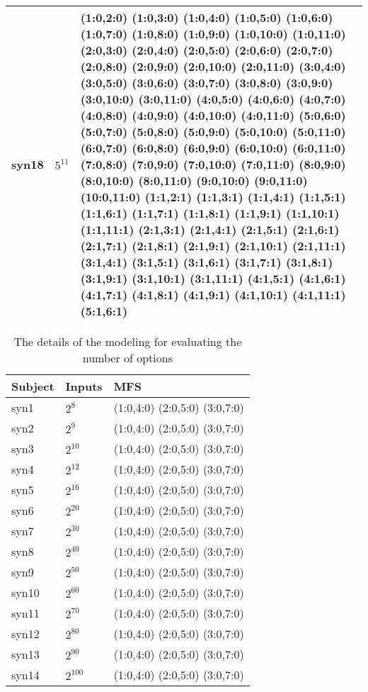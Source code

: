 \documentclass[10pt,journal,compsoc]{IEEEtran}
\begin{document}
\begin{table*}[htbp]
\begin{tabular}{|c|c|m{}|}
syn18 & $5^{11}$ & (1:0,2:0) (1:0,3:0) (1:0,4:0) (1:0,5:0) (1:0,6:0) (1:0,7:0) (1:0,8:0) (1:0,9:0) (1:0,10:0) (1:0,11:0) (2:0,3:0) (2:0,4:0) (2:0,5:0) (2:0,6:0) (2:0,7:0) (2:0,8:0) (2:0,9:0) (2:0,10:0) (2:0,11:0) (3:0,4:0) (3:0,5:0) (3:0,6:0) (3:0,7:0) (3:0,8:0) (3:0,9:0) (3:0,10:0) (3:0,11:0) (4:0,5:0) (4:0,6:0) (4:0,7:0) (4:0,8:0) (4:0,9:0) (4:0,10:0) (4:0,11:0) (5:0,6:0) (5:0,7:0) (5:0,8:0) (5:0,9:0) (5:0,10:0) (5:0,11:0) (6:0,7:0) (6:0,8:0) (6:0,9:0) (6:0,10:0) (6:0,11:0) (7:0,8:0) (7:0,9:0) (7:0,10:0) (7:0,11:0) (8:0,9:0) (8:0,10:0) (8:0,11:0) (9:0,10:0) (9:0,11:0) (10:0,11:0) (1:1,2:1) (1:1,3:1) (1:1,4:1) (1:1,5:1) (1:1,6:1) (1:1,7:1) (1:1,8:1) (1:1,9:1) (1:1,10:1) (1:1,11:1) (2:1,3:1) (2:1,4:1) (2:1,5:1) (2:1,6:1) (2:1,7:1) (2:1,8:1) (2:1,9:1) (2:1,10:1) (2:1,11:1) (3:1,4:1) (3:1,5:1) (3:1,6:1) (3:1,7:1) (3:1,8:1) (3:1,9:1) (3:1,10:1) (3:1,11:1) (4:1,5:1) (4:1,6:1) (4:1,7:1) (4:1,8:1) (4:1,9:1) (4:1,10:1) (4:1,11:1) (5:1,6:1)  \\ \hline

\end{tabular}

\end{table*}
\begin{table}[htbp]
\center
\caption{The details of the modeling for evaluating the number of options}
\label{detail-eva-op}

\begin{tabular}{|l|l|l|}
\hline
Subject & Inputs & MFS  \\\hline
syn1 & $2^{8}$ & (1:0,4:0) (2:0,5:0) (3:0,7:0)  \\ \hline
syn2 & $2^{9}$ & (1:0,4:0) (2:0,5:0) (3:0,7:0)  \\ \hline
syn3 & $2^{10}$ & (1:0,4:0) (2:0,5:0) (3:0,7:0)  \\ \hline
syn4 & $2^{12}$ & (1:0,4:0) (2:0,5:0) (3:0,7:0)  \\ \hline
syn5 & $2^{16}$ & (1:0,4:0) (2:0,5:0) (3:0,7:0)  \\ \hline
syn6 & $2^{20}$ & (1:0,4:0) (2:0,5:0) (3:0,7:0)  \\ \hline
syn7 & $2^{30}$ & (1:0,4:0) (2:0,5:0) (3:0,7:0)  \\ \hline
syn8 & $2^{40}$ & (1:0,4:0) (2:0,5:0) (3:0,7:0)  \\ \hline
syn9 & $2^{50}$ & (1:0,4:0) (2:0,5:0) (3:0,7:0)  \\ \hline
syn10 & $2^{60}$ & (1:0,4:0) (2:0,5:0) (3:0,7:0)  \\ \hline
syn11 & $2^{70}$ & (1:0,4:0) (2:0,5:0) (3:0,7:0)  \\ \hline
syn12 & $2^{80}$ & (1:0,4:0) (2:0,5:0) (3:0,7:0)  \\ \hline
syn13 & $2^{90}$ & (1:0,4:0) (2:0,5:0) (3:0,7:0)  \\ \hline
syn14 & $2^{100}$ & (1:0,4:0) (2:0,5:0) (3:0,7:0)  \\ \hline
\end{tabular}

\end{table}
\end{document}
